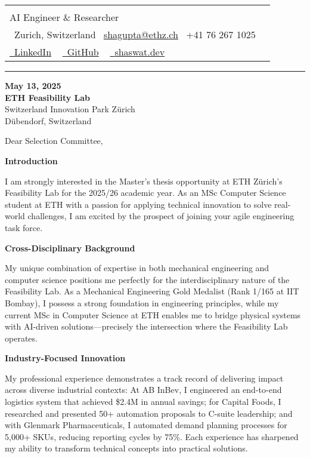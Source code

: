 \documentclass[letterpaper,10pt]{article}
\makeatletter
\newcommand{\icontext}[2]{\raisebox{-0.2\height}{#1}~#2}
\newcommand{\profileheader}{%
  \begin{profilebox}
    \begin{tabularx}{\textwidth}{@{}l@{\hspace{1.1cm}}X@{}}
      \fcolorbox{accentblue}{white}{
        \texttt{[image: shaswat.png]}
      }
      &
      \begin{minipage}[b]{\linewidth}
        {\Huge \textcolor{darkroyalblue}{\scshape Shaswat Gupta}} \\[3pt]
        {\large \textcolor{mutedtext}{AI Engineer \& Researcher}} \\[6pt]
        \icontext{\faMapMarker}{\textcolor{mutedtext}{Zurich, Switzerland}} \quad
        \icontext{\faEnvelope}{\href{mailto:shagupta@ethz.ch}{\textcolor{accentblue}{shagupta@ethz.ch}}} \quad
        \icontext{\faPhone}{\textcolor{accentblue}{+41 76 267 1025}} \\[5pt]
        \href{https://linkedin.com/in/shaswat-gupta/}{\icontext{\faLinkedin}{\textcolor{accentblue}{LinkedIn}}} ~
        \href{https://github.com/Shaswat-G}{\icontext{\faGithub}{\textcolor{accentblue}{GitHub}}} ~
        \href{https://shaswat.dev}{\icontext{\faGlobe}{\textcolor{accentblue}{shaswat.dev}}}
      \end{minipage}
    \end{tabularx}
    \vspace{6pt}
    \hrule height 1.2pt \color{bordercolor}
  \end{profilebox}
}
\newcommand{\letterSection}[1]{%
    \vspace{3 pt}
  \begin{sectionbox}
    \color{darkroyalblue}\scshape\raggedright\large\bfseries #1
  \end{sectionbox}
  \vspace{1 pt}
}
\makeatother
\begin{document}
\profileheader

{\color{mutedtext}
\begin{justify} %
\textbf{May 13, 2025} \\[1pt]
\textbf{ETH Feasibility Lab} \\
Switzerland Innovation Park Zürich \\
Dübendorf, Switzerland
\end{justify}
}

\vspace{8pt}

{\color{headercolor}
\begin{justify} %
Dear Selection Committee,
\end{justify}
}


\letterSection{Introduction}
\begin{justify}
I am strongly interested in the Master's thesis opportunity at ETH Zürich's Feasibility Lab for the 2025/26 academic year. As an MSc Computer Science student at ETH with a passion for applying technical innovation to solve real-world challenges, I am excited by the prospect of joining your agile engineering task force.
\end{justify}

\letterSection{Cross-Disciplinary Background}
\begin{justify}
My unique combination of expertise in both mechanical engineering and computer science positions me perfectly for the interdisciplinary nature of the Feasibility Lab. As a Mechanical Engineering Gold Medalist (Rank 1/165 at IIT Bombay), I possess a strong foundation in engineering principles, while my current MSc in Computer Science at ETH enables me to bridge physical systems with AI-driven solutions—precisely the intersection where the Feasibility Lab operates.
\end{justify}


\letterSection{Industry-Focused Innovation}
\begin{justify}
My professional experience demonstrates a track record of delivering impact across diverse industrial contexts: At AB InBev, I engineered an end-to-end logistics system that achieved \$2.4M in annual savings; for Capital Foods, I researched and presented 50+ automation proposals to C-suite leadership; and with Glenmark Pharmaceuticals, I automated demand planning processes for 5,000+ SKUs, reducing reporting cycles by 75\%. Each experience has sharpened my ability to transform technical concepts into practical solutions.
\end{justify}
\end{document}
